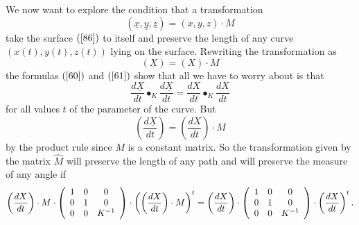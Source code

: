 We now want to explore the condition that a transformation%
\[
\left(  \underline{x},\underline{y},\underline{z}\right)  =\left(
x,y,z\right)  \cdot M
\]
take the surface $\left(  \ref{86}\right)  $ to itself and preserve the length
of any curve $\left(  x\left(  t\right)  ,y\left(  t\right)  ,z\left(
t\right)  \right)  $ lying on the surface. Rewriting the transformation as%
\[
\left(  \underline{X}\right)  =\left(  X\right)  \cdot M
\]
the formulas $\left(  \ref{60}\right)  $ and $\left(  \ref{61}\right)  $ show
that all we have to worry about is that%
\[
\frac{d\underline{X}}{dt}\bullet_{K}\frac{d\underline{X}}{dt}=\frac{dX}%
{dt}\bullet_{K}\frac{dX}{dt}%
\]
for all values $t$ of the parameter of the curve. But%
\[
\left(  \frac{d\underline{X}}{dt}\right)  =\left(  \frac{dX}{dt}\right)  \cdot
M
\]
by the product rule since $M$ is a constant matrix. So the transformation
given by the matrix $\hat{M}$ will preserve the length of any path and will
preserve the measure of any angle if%
\begin{equation}
\left(  \frac{dX}{dt}\right)  \cdot M\cdot\left(
\begin{array}
[c]{ccc}%
1 & 0 & 0\\
0 & 1 & 0\\
0 & 0 & K^{-1}%
\end{array}
\right)  \cdot\left(  \left(  \frac{dX}{dt}\right)  \cdot M\right)
^{t}=\left(  \frac{dX}{dt}\right)  \cdot\left(
\begin{array}
[c]{ccc}%
1 & 0 & 0\\
0 & 1 & 0\\
0 & 0 & K^{-1}%
\end{array}
\right)  \cdot\left(  \frac{dX}{dt}\right)  ^{t}. \label{89}%
\end{equation}


